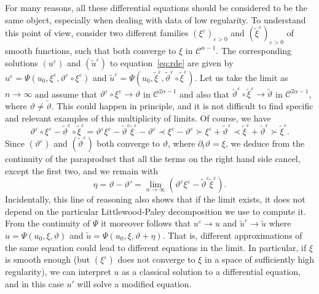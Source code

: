 \documentclass[11pt,a4paper]{article}
\theoremstyle{remark}
\newcommand{\CC}{\ensuremath{\mathscr{C}}}
\begin{document}
For many reasons, all these differential equations should be considered to be
the same object, especially when dealing with data of low regularity. To
understand this point of view, consider two different families $( \xi^{\varepsilon})_{\varepsilon >0}$ and $( \tilde{\xi}^\varepsilon )_{\varepsilon > 0}$ of smooth
functions, such that both converge to $\xi$ in $\CC^{\alpha -1}$. The
corresponding solutions $( u^\varepsilon )$ and $( \tilde{u}^\varepsilon)$ to
equation~{\eqref{eq:rde}} are given by $u^\varepsilon = \Psi ( u_{0} , \xi^\varepsilon ,\vartheta^\varepsilon \circ   \xi^\varepsilon )$ and $\tilde{u}^\varepsilon = \Psi ( u_{0} , \tilde{\xi}^\varepsilon,
\tilde{\vartheta}^\varepsilon \circ \tilde{\xi}^\varepsilon)$. Let us take the limit as $n \rightarrow \infty$ and assume that $\vartheta^\varepsilon \circ   \xi^\varepsilon \rightarrow \vartheta$
in $\CC^{2 \alpha -1}$ and also that $\tilde{\vartheta}^\varepsilon \circ   \tilde{\xi}^\varepsilon \rightarrow \tilde\vartheta$ in $\CC^{2 \alpha -1}$, where $\vartheta \neq \tilde\vartheta$. This could happen in principle, and it is not difficult to find specific and relevant examples of this multiplicity of limits. Of course, we have
\[
   \vartheta^\varepsilon \circ \xi^\varepsilon - \tilde{\vartheta}^\varepsilon \circ \tilde{\xi}^\varepsilon = \vartheta^\varepsilon \xi^\varepsilon - \tilde{\vartheta}^\varepsilon \tilde{\xi}^\varepsilon - \vartheta^\varepsilon \prec \xi^\varepsilon -  \vartheta^\varepsilon \succ \xi^\varepsilon + \tilde{\vartheta}^\varepsilon \prec \tilde{\xi}^\varepsilon +  \tilde{\vartheta}^\varepsilon \succ \tilde{\xi}^\varepsilon.
\]
Since $( \vartheta^\varepsilon )$ and $( \tilde{\vartheta}^\varepsilon )$ both converge to
$\vartheta$, where $\partial_{t} \vartheta = \xi$, we deduce from the
continuity of the paraproduct that all the terms on the right hand side cancel, except the first two, and we remain with
\[
   \eta = \vartheta - \vartheta' = \lim_{n \rightarrow \infty} ( \vartheta^\varepsilon \xi^\varepsilon - \tilde{\vartheta}^\varepsilon \tilde{\xi}^\varepsilon ).
\]
Incidentally, this line of reasoning also shows that if the limit exists, it
does not depend on the particular Littlewood-Paley decomposition we use to
compute it. From the continuity of $\Psi$ it moreover follows that $u^\varepsilon \rightarrow u$ and $\tilde{u}^\varepsilon \rightarrow \tilde{u}$ where $u= \Psi ( u_{0} , \xi , \vartheta )$ and $\tilde{u} = \Psi ( u_{0} , \xi , \vartheta + \eta )$. That is,
different approximations of the same equation could lead to different
equations in the limit. In particular, if $\xi$ is smooth enough (but
$(\xi^\varepsilon)$ does not converge to $\xi$ in a space of sufficiently high
regularity), we can interpret $u$ as a classical solution to a differential
equation, and in this case $u'$ will solve a modified equation.
\end{document}
